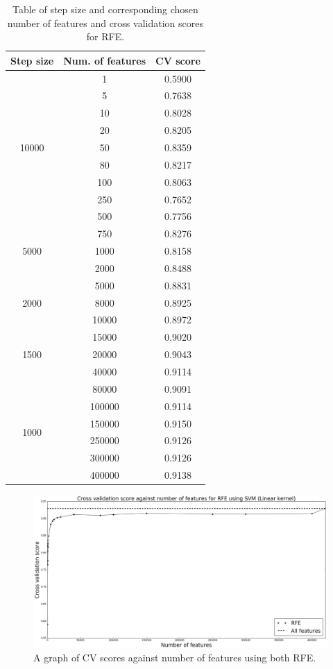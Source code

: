 \documentclass[12pt, twoside, a4paper]{report}
\begin{document}
\begin{table}
\centering
    \begin{tabular}{ | c | c | c | } \hline
    Step size & Num. of features & CV score \\ \hline
    \multirow{9}{*}{10000} & 
  1 & 0.5900  \\
 & 5 & 0.7638   \\
 & 10 & 0.8028  \\
 & 20 & 0.8205  \\
 & 50 & 0.8359 \\
 & 80 & 0.8217 \\
 & 100 & 0.8063 \\
 & 250 & 0.7652 \\
 & 500 & 0.7756 \\ \hline
 
 \multirow{3}{*}{5000} & 
  750 & 0.8276  \\
 & 1000 & 0.8158 \\
 & 2000 & 0.8488 \\ \hline
 
 \multirow{3}{*}{2000} & 
  5000 & 0.8831 \\
 & 8000 & 0.8925 \\
 & 10000 & 0.8972 \\ \hline
 
 \multirow{3}{*}{1500} & 
  15000 & 0.9020 \\
 & 20000 & 0.9043 \\
 & 40000 & 0.9114 \\ \hline
 
 \multirow{6}{*}{1000} & 
  80000 & 0.9091 \\
 & 100000 & 0.9114 \\
 & 150000 & 0.9150 \\
  & 250000 & 0.9126 \\
   & 300000 & 0.9126 \\
    & 400000 & 0.9138 \\ \hline
    \end{tabular}
\caption{Table of step size and corresponding chosen number of features and cross validation scores for RFE.}
\label{rfe_results_table}
\end{table}


\begin{figure}
\centering
\includegraphics[width=\textwidth]{images/rfe_linear_all.jpeg}
\caption{A graph of CV scores against number of features using both RFE.}
\label{body:rfe:graph}
\end{figure}
\end{document}
